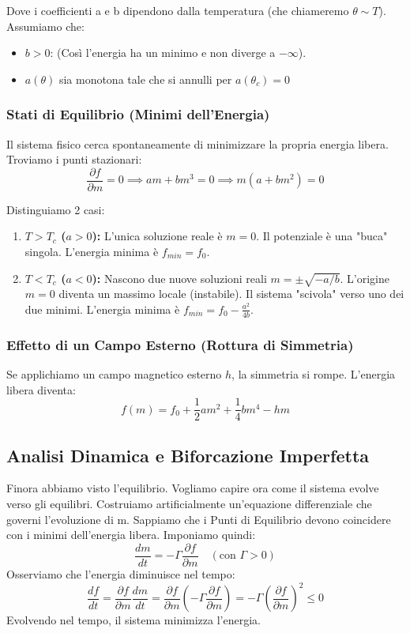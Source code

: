 \documentclass[openany]{book}
\theoremstyle{definition}
\theoremstyle{remark}
\begin{document}
Dove i coefficienti a e b dipendono dalla temperatura (che chiameremo $\theta \sim T$). Assumiamo
che:
\begin{itemize}
    \item $b > 0$: (Così l'energia ha un minimo e non diverge a $-\infty$).  \item $a(\theta)$ sia monotona tale che si annulli per $a(\theta_c)=0$
\end{itemize}

\subsubsection*{Stati di Equilibrio (Minimi dell'Energia)}
Il sistema fisico cerca spontaneamente di minimizzare la propria energia libera.
Troviamo i punti stazionari:
\[ \frac{\partial f}{\partial m} = 0 \implies am + b m^3 = 0 \implies m(a + b m^2) = 0 \]

Distinguiamo 2 casi:
\begin{enumerate}
    \item \textbf{$T > T_c$ ($a > 0$):} L'unica soluzione reale è $m=0$. Il potenziale è una "buca" singola. 
    L'energia minima è $f_{min}=f_0$.
    \item \textbf{$T < T_c$ ($a < 0$):} Nascono due nuove soluzioni reali $m = \pm \sqrt{-a/b}$. L'origine $m=0$ diventa un massimo locale (instabile). Il sistema "scivola" verso uno dei due minimi.    L'energia minima è $f_{min}=f_0-\frac{a^2}{4b}$.
\end{enumerate}

\subsubsection*{Effetto di un Campo Esterno (Rottura di Simmetria)}
Se applichiamo un campo magnetico esterno $h$, la simmetria si rompe. 
L'energia libera diventa:
\begin{equation}
    f(m) = f_0 + \frac{1}{2} a m^2 + \frac{1}{4} b m^4 - h m
\end{equation}

\subsection*{Analisi Dinamica e Biforcazione Imperfetta}
Finora abbiamo visto l’equilibrio. Vogliamo capire ora come il sistema evolve verso gli equilibri.
Costruiamo artificialmente un’equazione differenziale che governi l’evoluzione di m.
Sappiamo che i Punti di Equilibrio devono coincidere con i minimi dell’energia libera.
Imponiamo quindi:
\begin{equation}
    \boxed{ \frac{dm}{dt} = - \Gamma \frac{\partial f}{\partial m} } \quad (\text{con } \Gamma > 0)
\end{equation}
Osserviamo che l'energia diminuisce nel tempo:
\[ \frac{df}{dt} = \frac{\partial f}{\partial m} \frac{dm}{dt} = \frac{\partial f}{\partial m} \left( - \Gamma \frac{\partial f}{\partial m} \right) = - \Gamma \left( \frac{\partial f}{\partial m} \right)^2 \le 0 \]
Evolvendo nel tempo, il sistema minimizza l'energia.
\end{document}
